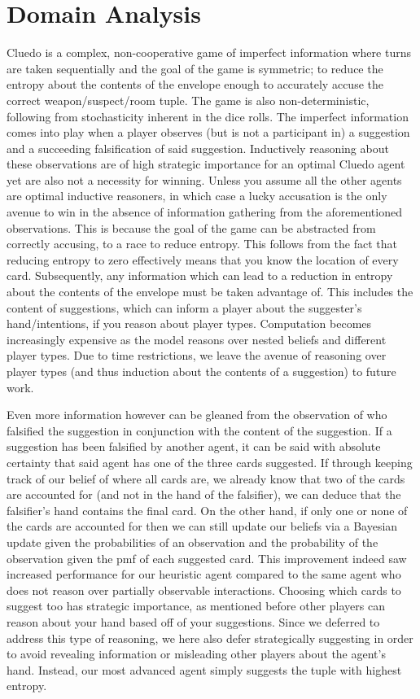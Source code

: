 \documentclass[msc, deptreport, ai, romanprepages]{infthesis}
\begin{document}
\section{Domain Analysis}
Cluedo is a complex, non-cooperative game of imperfect information where turns are taken sequentially and the goal of the game is symmetric; to reduce the entropy about the contents of the envelope enough to accurately accuse the correct weapon/suspect/room tuple. The game is also non-deterministic, following from stochasticity inherent in the dice rolls. The imperfect information comes into play when a player observes (but is not a participant in) a suggestion and a succeeding falsification of said suggestion. Inductively reasoning about these observations are of high strategic importance for an optimal Cluedo agent yet are also not a necessity for winning. Unless you assume all the other agents are optimal inductive reasoners, in which case a lucky accusation is the only avenue to win in the absence of information gathering from the aforementioned observations. This is because the goal of the game can be abstracted from correctly accusing, to a race to reduce entropy. This follows from the fact that reducing entropy to zero effectively means that you know the location of every card. Subsequently, any information which can lead to a reduction in entropy about the contents of the envelope must be taken advantage of. This includes the content of suggestions, which can inform a player about the suggester’s hand/intentions, if you reason about player types. Computation becomes increasingly expensive as the model reasons over nested beliefs and different player types. Due to time restrictions, we leave the avenue of reasoning over player types (and thus induction about the contents of a suggestion) to future work. 

Even more information however can be gleaned from the observation of who falsified the suggestion in conjunction with the content of the suggestion. If a suggestion has been falsified by another agent, it can be said with absolute certainty that said agent has one of the three cards suggested. If through keeping track of our belief of where all cards are, we already know that two of the cards are accounted for (and not in the hand of the falsifier), we can deduce that the falsifier’s hand contains the final card. On the other hand, if only one or none of the cards are accounted for then we can still update our beliefs via a Bayesian update given the probabilities of an observation and the probability of the observation given the pmf of each suggested card. This improvement indeed saw increased performance for our heuristic agent compared to the same agent who does not reason over partially observable interactions. Choosing which cards to suggest too has strategic importance, as mentioned before other players can reason about your hand based off of your suggestions. Since we deferred to address this type of reasoning, we here also defer strategically suggesting in order to avoid revealing information or misleading other players about the agent’s hand. Instead, our most advanced agent simply suggests the tuple with highest entropy. 
\end{document}
